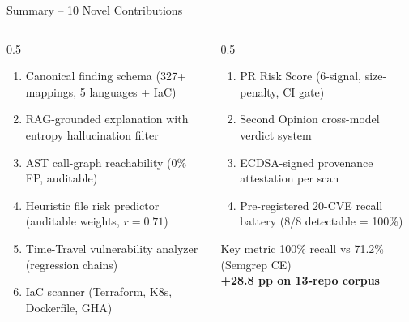 \documentclass[aspectratio=169,12pt]{beamer}
\begin{document}
\begin{frame}{Summary -- 10 Novel Contributions}
  \begin{columns}[T]
    \begin{column}{0.5\textwidth}
      \begin{enumerate}\small
        \item Canonical finding schema (327+ mappings, 5 languages + IaC)
        \item RAG-grounded explanation with entropy hallucination filter
        \item AST call-graph reachability (0\% FP, auditable)
        \item Heuristic file risk predictor (auditable weights, $r=0.71$)
        \item Time-Travel vulnerability analyzer (regression chains)
        \item IaC scanner (Terraform, K8s, Dockerfile, GHA)
      \end{enumerate}
    \end{column}
    \begin{column}{0.5\textwidth}
      \begin{enumerate}\small
        \addtocounter{enumi}{6}
        \item PR Risk Score (6-signal, size-penalty, CI gate)
        \item Second Opinion cross-model verdict system
        \item ECDSA-signed provenance attestation per scan
        \item Pre-registered 20-CVE recall battery (8/8 detectable = 100\%)
      \end{enumerate}
      \vspace{6pt}
      \begin{exampleblock}{Key metric}
        100\% recall vs 71.2\% (Semgrep CE)\\
        \textbf{+28.8 pp on 13-repo corpus}
      \end{exampleblock}
    \end{column}
  \end{columns}
\end{frame}
\end{document}

